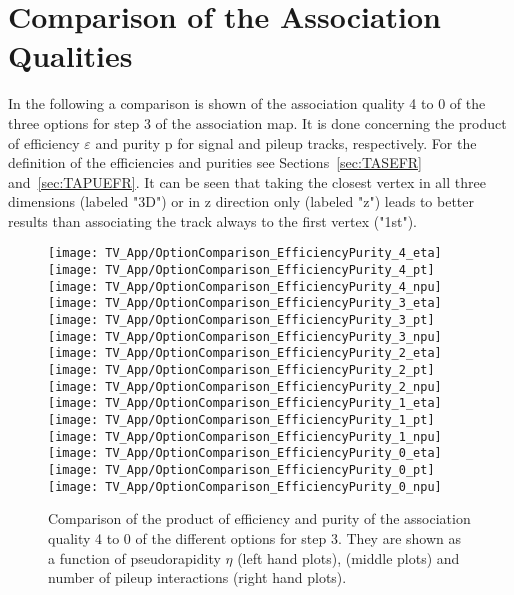 \chapter{Comparison of the Association Qualities\label{sec:TrackAss_App} }

In the following a comparison is shown of the association quality 4 to 0 of the three options for step 3 of the association map. It is done concerning the product of efficiency $\varepsilon$ and purity p for signal and pileup tracks, respectively. For the definition of the efficiencies and purities see Sections~\ref{sec:TASEFR} and~\ref{sec:TAPUEFR}. It can be seen that taking the closest vertex in all three dimensions (labeled "3D") or in z direction only (labeled "z") leads to better results than associating the track always to the first vertex ("1st").

\begin{figure}[!h]
  \centering
  \texttt{[image: TV\_App/OptionComparison\_EfficiencyPurity\_4\_eta]}
  \texttt{[image: TV\_App/OptionComparison\_EfficiencyPurity\_4\_pt]}
  \texttt{[image: TV\_App/OptionComparison\_EfficiencyPurity\_4\_npu]}
  \\
  \texttt{[image: TV\_App/OptionComparison\_EfficiencyPurity\_3\_eta]}
  \texttt{[image: TV\_App/OptionComparison\_EfficiencyPurity\_3\_pt]}
  \texttt{[image: TV\_App/OptionComparison\_EfficiencyPurity\_3\_npu]}
  \\
  \texttt{[image: TV\_App/OptionComparison\_EfficiencyPurity\_2\_eta]}
  \texttt{[image: TV\_App/OptionComparison\_EfficiencyPurity\_2\_pt]}
  \texttt{[image: TV\_App/OptionComparison\_EfficiencyPurity\_2\_npu]}
  \\
  \texttt{[image: TV\_App/OptionComparison\_EfficiencyPurity\_1\_eta]}
  \texttt{[image: TV\_App/OptionComparison\_EfficiencyPurity\_1\_pt]}
  \texttt{[image: TV\_App/OptionComparison\_EfficiencyPurity\_1\_npu]}
  \\
  \texttt{[image: TV\_App/OptionComparison\_EfficiencyPurity\_0\_eta]}
  \texttt{[image: TV\_App/OptionComparison\_EfficiencyPurity\_0\_pt]}
  \texttt{[image: TV\_App/OptionComparison\_EfficiencyPurity\_0\_npu]}
  \\
\caption[Comparison of the association quality 4 to 0 of the different options for step 3.]{Comparison of the product of efficiency and purity of the association quality 4 to 0 of the different options for step 3. They are shown as a function of pseudorapidity $\eta$ (left hand plots), \pt{} (middle plots) and number of pileup interactions (right hand plots). \label{sec:TrackAss_AppSignal}}
\end{figure}

